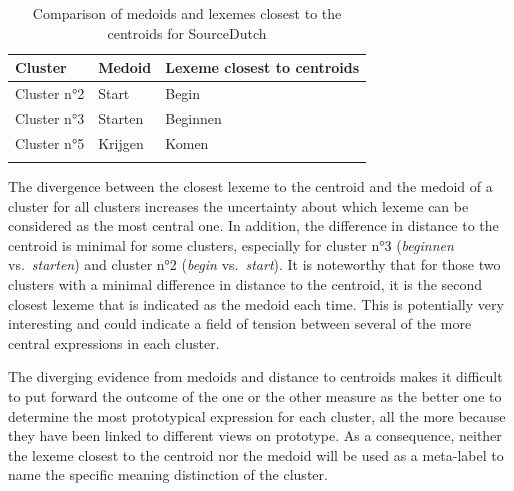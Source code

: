 \begin{table}
\caption{\label{tab:4:14}  Comparison of medoids and lexemes closest to the centroids for SourceDutch}
\begin{tabularx}{\textwidth}{XXl} 
\lsptoprule
Cluster & Medoid & Lexeme closest to centroids\\
\midrule
Cluster n°2 & Start & Begin\\
Cluster n°3 & Starten & Beginnen\\
Cluster n°5 & Krijgen & Komen\\
\lspbottomrule
\end{tabularx}
\end{table}

The divergence between the closest lexeme to the centroid and the medoid of a cluster for all clusters increases the uncertainty about which lexeme can be considered as the most central one. In addition, the difference in distance to the centroid is minimal for some clusters, especially for cluster n°3 (\textit{beginnen} vs.\ \textit{starten}) and cluster n°2 (\textit{begin} vs.\ \textit{start}). It is noteworthy that for those two clusters with a minimal difference in distance to the centroid, it is the second closest lexeme that is indicated as the medoid each time. This is potentially very interesting and could indicate a field of tension between several of the more central expressions in each cluster.

The diverging evidence from medoids and distance to centroids makes it difficult to put forward the outcome of the one or the other measure as the better one to determine the most prototypical expression for each cluster, all the more because they have been linked to different views on prototype. As a consequence, neither the lexeme closest to the centroid nor the medoid will be used as a meta-label to name the specific meaning distinction of the cluster.

